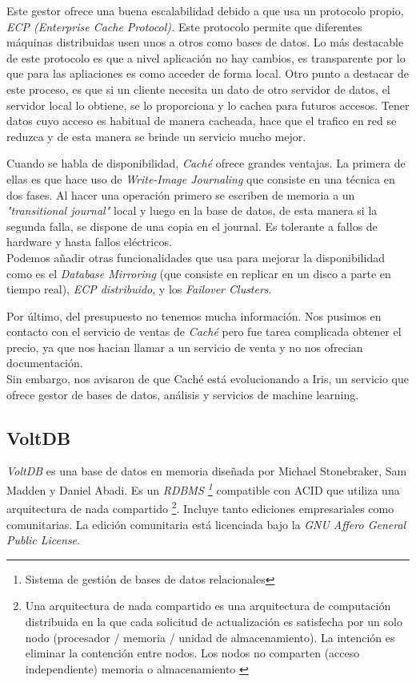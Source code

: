 \documentclass{article}
\begin{document}
Este gestor ofrece una buena escalabilidad debido a que usa un protocolo propio, \emph{ECP (Enterprise Cache Protocol).} Este protocolo permite que diferentes máquinas distribuidas usen unos a otros como bases de datos. Lo más destacable de este protocolo es que a nivel aplicación no hay cambios, es transparente por lo que para las apliaciones es como acceder de forma local. Otro punto a destacar de este proceso, es que si un cliente necesita un dato de otro servidor de datos, el servidor local lo obtiene, se lo proporciona y lo cachea para futuros accesos. Tener datos cuyo acceso es habitual de manera cacheada, hace que el trafico en red se reduzca y de esta manera se brinde un servicio mucho mejor.

Cuando  se habla de disponibilidad, \emph{Caché} ofrece grandes ventajas. La primera de ellas es que hace uso de \emph{Write-Image Journaling} que consiste en una técnica en dos fases. Al hacer una operación primero se escriben de memoria a un \emph{"transitional journal"} local  y luego en la base de datos, de esta manera si la segunda falla, se dispone de una copia en el journal. Es tolerante a fallos de hardware y hasta fallos eléctricos. \\
Podemos añadir otras funcionalidades que usa para mejorar la disponibilidad como es el \emph{Database Mirroring} (que consiste en replicar en un disco a parte en tiempo real), \emph{ECP distribuido}, y los \emph{Failover Clusters}.

Por último, del presupuesto no tenemos mucha información. Nos pusimos en contacto con el servicio de ventas de \emph{Caché} pero fue tarea complicada obtener el precio, ya que nos hacian llamar a un servicio de venta y no nos ofrecian documentación.\\ Sin embargo, nos avisaron de que Caché está evolucionando a Iris, un servicio que ofrece gestor de bases de datos, análisis y servicios de machine learning.\\

\subsection{VoltDB}
\emph{VoltDB} es una base de datos en memoria diseñada por Michael Stonebraker, Sam Madden y Daniel Abadi. Es un \emph{RDBMS \footnote{Sistema de gestión de bases de datos relacionales }} compatible con ACID que utiliza una arquitectura de nada compartido \footnote{Una arquitectura de nada compartido es una arquitectura de computación distribuida en la que cada solicitud de actualización es satisfecha por un solo nodo (procesador / memoria / unidad de almacenamiento). La intención es eliminar la contención entre nodos. Los nodos no comparten (acceso independiente) memoria o almacenamiento \cite{VOLT:1}}. Incluye tanto ediciones empresariales como comunitarias. La edición comunitaria está licenciada bajo la \emph{GNU Affero General Public License}. \cite{VOLT:2}\\
\end{document}
